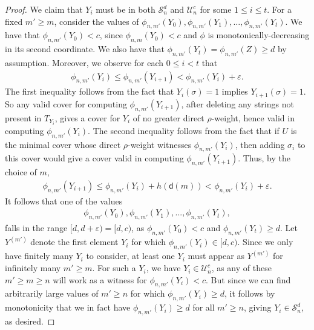 \begin{proof}
    We claim that $Y_i$ must be in both $\mathcal{S}_n^d$ and $\mathcal{U}^c_n$ for some $1 \leq i \leq t$. For a fixed $m' \geq m$, consider the values of $\phi_{n, m'}(Y_0), \phi_{n, m'}(Y_1), \dots, \phi_{n, m'}(Y_t)$. We have that $\phi_{n, m'}(Y_0) < c$, since $\phi_{n, m}(Y_0) < c$ and $\phi$ is monotonically-decreasing in its second coordinate. We also have that $\phi_{n, m'}(Y_t) = \phi_{n, m'}(Z) \geq d$ by assumption. Moreover, we observe for each $0 \leq i < t$ that 
    \begin{align*}
        \phi_{n, m'}(Y_i) \leq \phi_{n, m'}(Y_{i + 1}) < \phi_{n, m'}(Y_i) + \varepsilon.
    \end{align*}
    The first inequality follows from the fact that $Y_i(\sigma) = 1$ implies $Y_{i + 1}(\sigma) = 1$. So any valid cover for computing $\phi_{n, m'}(Y_{i + 1})$, after deleting any strings not present in $T_{Y_i}$, gives a cover for $Y_i$ of no greater direct $\rho$-weight, hence valid in computing $\phi_{n, m'}(Y_i)$. The second inequality follows from the fact that if $U$ is the minimal cover whose direct $\rho$-weight witnesses $\phi_{n, m'}(Y_i)$, then adding $\sigma_i$ to this cover would give a cover valid in computing $\phi_{n, m'}(Y_{i + 1})$. Thus, by the choice of $m$,
    \begin{align*}
        \phi_{n, m'}(Y_{i + 1}) \leq \phi_{n, m'}(Y_i) + h(\mathsf{d}(m)) < \phi_{n, m'}(Y_i) + \varepsilon.
    \end{align*}
    It follows that one of the values 
    \begin{align*}
        \phi_{n, m'}(Y_0), \phi_{n, m'}(Y_1), ..., \phi_{n, m'}(Y_t),
    \end{align*}
    falls in the range $[d, d + \varepsilon) = [d, c)$, as $\phi_{n, m'}(Y_0) < c$ and $\phi_{n, m'}(Y_t) \geq d$. Let $Y^{(m')}$ denote the first element $Y_i$ for which $\phi_{n, m'}(Y_i) \in [d, c)$. Since we only have finitely many $Y_i$ to consider, at least one $Y_i$ must appear as $Y^{(m')}$ for infinitely many $m' \geq m$. For such a $Y_i$, we have $Y_i \in \mathcal{U}^c_n$, as any of these $m' \geq m \geq n$ will work as a witness for $\phi_{n, m'}(Y_i) < c$. But since we can find arbitrarily large values of $m' \geq n$ for which $\phi_{n, m'}(Y_i) \geq d$, it follows by monotonicity that we in fact have $\phi_{n, m'}(Y_i) \geq d$ for all $m' \geq n$, giving $Y_i \in \mathcal{S}^d_n$, as desired. 
\end{proof}


